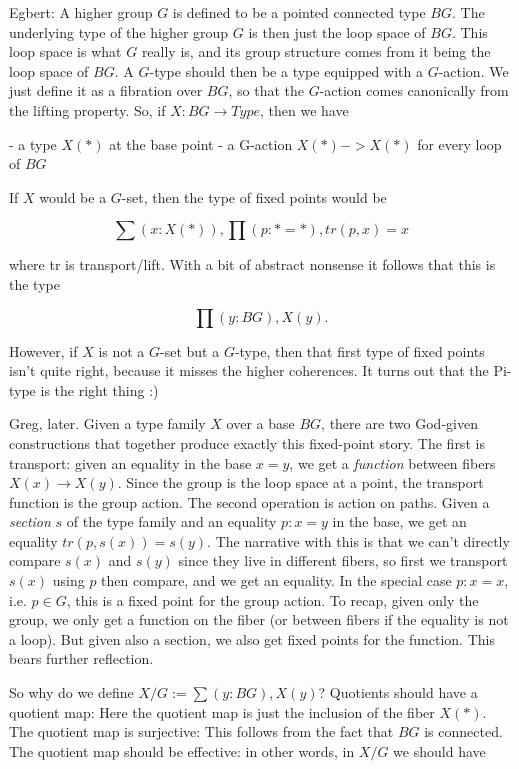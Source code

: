 \documentclass[12pt]{article}
\begin{document}
Egbert: A higher group $G$ is defined to be a pointed connected type $BG$. The underlying type of the higher group $G$ is then just the loop space of $BG$. This loop space is what $G$ really is, and its group structure comes from it being the loop space of $BG$. A $G$-type should then be a type equipped with a $G$-action. We just define it as a fibration over $BG$, so that the $G$-action comes canonically from the lifting property. So, if $X : BG \to Type$, then we have

- a type $X(*)$ at the base point
- a G-action $X(*) -> X(*)$ for every loop of $BG$

If $X$ would be a $G$-set, then the type of fixed points would be

$$\sum (x : X(*)), \prod (p : * = *), tr(p,x) = x$$

where tr is transport/lift. With a bit of abstract nonsense it follows that this is the type

$$\prod (y : BG), X(y).$$

However, if $X$ is not a $G$-set but a $G$-type, then that first type of fixed points isn't quite right, because it misses the higher coherences. It turns out that the Pi-type is the right thing :)

Greg, later. Given a type family $X$ over a base $BG$, there are two God-given constructions that together produce exactly this fixed-point story. The first is transport: given an equality in the base $x = y$, we get a \emph{function} between fibers $X(x)\to X(y)$. Since the group is the loop space at a point, the transport function is the group action. The second operation is action on paths. Given a \emph{section} $s$  of the type family and an equality $p : x = y$ in the base, we get an equality $tr(p, s(x)) = s(y)$. The narrative with this is that we can't directly compare $s(x)$ and $s(y)$ since they live in different fibers, so first we transport $s(x)$ using $p$ then compare, and we get an equality. In the special case $p : x = x$, i.e. $p \in G$, this is a fixed point for the group action. To recap, given only the group, we only get a function on the fiber (or between fibers if the equality is not a loop). But given also a section, we also get fixed points for the function. This bears further reflection.

So why do we define $X/G := \sum (y : BG), X(y)$? Quotients should have a quotient map: Here the quotient map is just the inclusion of the fiber $X(*)$. The quotient map is surjective: This follows from the fact that $BG$ is connected. The quotient map should be effective: in other words, in $X/G$ we should have
\end{document}
